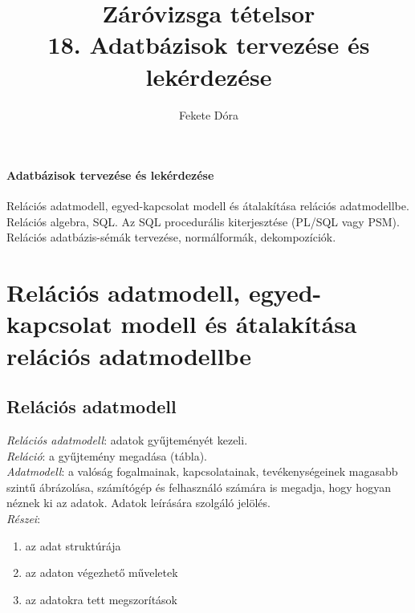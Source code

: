 \documentclass[margin=0px]{article}
\title{Záróvizsga tételsor \\ \large 18. Adatbázisok tervezése és lekérdezése}
\date{}
\author{Fekete Dóra}
\newenvironment{tetel}[1]{\paragraph{#1 \\}}{}
\begin{document}
	\maketitle
	
	\begin{tetel}{Adatbázisok tervezése és lekérdezése}
			Relációs adatmodell, egyed-kapcsolat modell és átalakítása relációs adatmodellbe. Relációs algebra, SQL. Az SQL procedurális kiterjesztése (PL/SQL vagy PSM). Relációs adatbázis-sémák tervezése, normálformák, dekompozíciók.
	\end{tetel}
	
	\section{Relációs adatmodell, egyed-kapcsolat modell és átalakítása relációs adatmodellbe}
	
	\subsection{Relációs adatmodell}
	
	\textit{Relációs adatmodell}: adatok gyűjteményét kezeli. \\
	\textit{Reláció}: a gyűjtemény megadása (tábla). \\
	\textit{Adatmodell}: a valóság fogalmainak, kapcsolatainak, tevékenységeinek magasabb szintű ábrázolása, számítógép és felhasználó számára is megadja, hogy hogyan néznek ki az adatok. Adatok leírására szolgáló jelölés. \\
	\textit{Részei}:
	\begin{enumerate}
		\item az adat struktúrája
		\item az adaton végezhető műveletek
		\item az adatokra tett megszorítások
	\end{enumerate}
	
\end{document}
